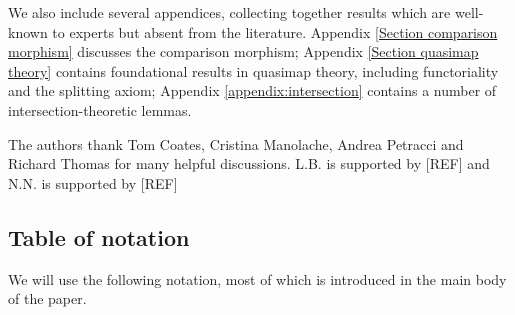 We also include several appendices, collecting together results which are well-known to experts but absent from the literature. Appendix \ref{Section comparison morphism} discusses the comparison morphism; Appendix \ref{Section quasimap theory} contains foundational results in quasimap theory, including functoriality and the splitting axiom; Appendix \ref{appendix:intersection} contains a number of intersection-theoretic lemmas.

\begin{acknowledgements} The authors thank Tom Coates, Cristina Manolache, Andrea Petracci and Richard Thomas for many helpful discussions. L.B. is supported by [REF] and N.N. is supported by [REF]
\end{acknowledgements}
\subsection{Table of notation} We will use the following notation, most of which is introduced in the main body of the paper.
